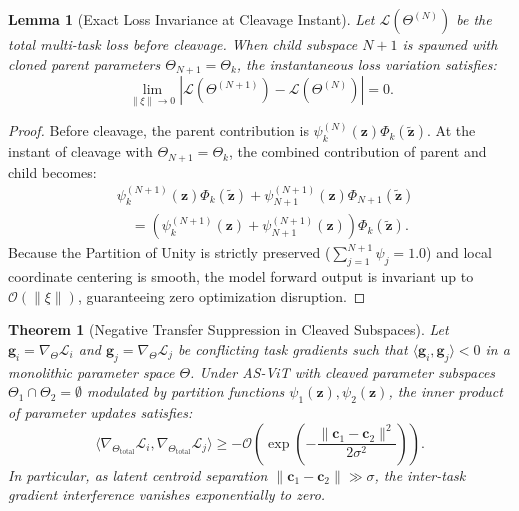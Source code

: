 \documentclass[10pt,journal,compsoc]{IEEEtran}
\newtheorem{theorem}{Theorem}
\newtheorem{lemma}{Lemma}
\begin{document}
\begin{lemma}[Exact Loss Invariance at Cleavage Instant]
Let $\mathcal{L}(\Theta^{(N)})$ be the total multi-task loss before cleavage. When child subspace $N+1$ is spawned with cloned parent parameters $\Theta_{N+1} = \Theta_k$, the instantaneous loss variation satisfies:
\begin{equation}
\lim_{\|\xi\| \to 0} \left| \mathcal{L}(\Theta^{(N+1)}) - \mathcal{L}(\Theta^{(N)}) \right| = 0.
\end{equation}
\end{lemma}
\begin{proof}
Before cleavage, the parent contribution is $\psi_k^{(N)}(\mathbf{z}) \Phi_k(\tilde{\mathbf{z}})$. At the instant of cleavage with $\Theta_{N+1} = \Theta_k$, the combined contribution of parent and child becomes:
\begin{equation}
\begin{aligned}
& \psi_k^{(N+1)}(\mathbf{z}) \Phi_k(\tilde{\mathbf{z}}) + \psi_{N+1}^{(N+1)}(\mathbf{z}) \Phi_{N+1}(\tilde{\mathbf{z}}) \\
& \quad = \left( \psi_k^{(N+1)}(\mathbf{z}) + \psi_{N+1}^{(N+1)}(\mathbf{z}) \right) \Phi_k(\tilde{\mathbf{z}}).
\end{aligned}
\end{equation}
Because the Partition of Unity is strictly preserved ($\sum_{j=1}^{N+1} \psi_j = 1.0$) and local coordinate centering is smooth, the model forward output is invariant up to $\mathcal{O}(\|\xi\|)$, guaranteeing zero optimization disruption.
\end{proof}

\begin{theorem}[Negative Transfer Suppression in Cleaved Subspaces]
\label{thm:negative_transfer}
Let $\mathbf{g}_i = \nabla_{\Theta} \mathcal{L}_i$ and $\mathbf{g}_j = \nabla_{\Theta} \mathcal{L}_j$ be conflicting task gradients such that $\langle \mathbf{g}_i, \mathbf{g}_j \rangle < 0$ in a monolithic parameter space $\Theta$. Under AS-ViT with cleaved parameter subspaces $\Theta_1 \cap \Theta_2 = \emptyset$ modulated by partition functions $\psi_1(\mathbf{z}), \psi_2(\mathbf{z})$, the inner product of parameter updates satisfies:
\begin{equation}
\langle \nabla_{\Theta_{\text{total}}} \mathcal{L}_i, \nabla_{\Theta_{\text{total}}} \mathcal{L}_j \rangle \ge - \mathcal{O}\left( \exp\left(-\frac{\|\mathbf{c}_1 - \mathbf{c}_2\|^2}{2\sigma^2}\right) \right).
\end{equation}
In particular, as latent centroid separation $\|\mathbf{c}_1 - \mathbf{c}_2\| \gg \sigma$, the inter-task gradient interference vanishes exponentially to zero.
\end{theorem}
\end{document}
